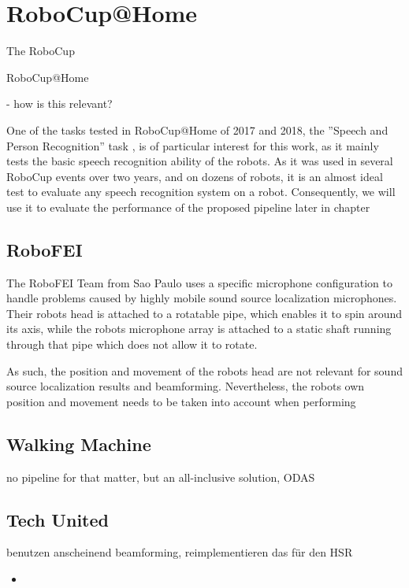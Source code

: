 
\section{RoboCup@Home}
The RoboCup %

RoboCup@Home %

- how is this relevant?

One of the tasks tested in RoboCup@Home of 2017 and 2018, the ''Speech and Person Recognition'' task \cite{rulebook_2018}, is of particular interest for this work, as it mainly tests the basic speech recognition ability of the robots. 
As it was used in several RoboCup events over two years, and on dozens of robots, it is an almost ideal test to evaluate any speech recognition system on a robot.
Consequently, we will use it to evaluate the performance of the proposed pipeline later in chapter %

\subsection{RoboFEI}

The RoboFEI Team from Sao Paulo uses a specific microphone configuration to handle problems caused by highly mobile sound source localization microphones. %
Their robots head is attached to a rotatable pipe, which enables it to spin around its axis, while the robots microphone array is attached to a static shaft running through that pipe which does not allow it to rotate.

As such, the position and movement of the robots head are not relevant for sound source localization results and beamforming.
Nevertheless, the robots own position and movement needs to be taken into account when performing 


\subsection{Walking Machine}
no pipeline for that matter, but an all-inclusive solution, ODAS

\subsection{Tech United}
benutzen anscheinend beamforming, reimplementieren das für den HSR

\begin{itemize}
	\item 
\end{itemize}

